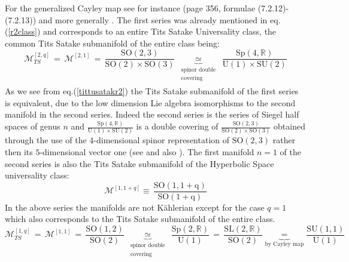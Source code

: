 \documentclass[10pt,a4paper]{article}
\begin{document}
For the generalized Cayley map see for instance \cite{advancio} (page 356, formulae (7.2.12)-(7.2.13)) and more generally \cite{mylecture}.
The first series was already mentioned in eq.(\ref{r2class}) and corresponds to an entire Tits Satake Universality class, the common Tits Satake submanifold of the entire class being:
\begin{equation}\label{tittusatakr2}
  \mathcal{M}^{[2,q]}_{TS} \, = \, \mathcal{M}^{[2,1]} \, = \, \frac{\mathrm{SO(2,3)}}{\mathrm{SO(2)}\times \mathrm{SO(3)}} \, \underbrace{\simeq}_{\begin{array}{c}
   \text{spinor double}\\
   \text{covering}\\
   \end{array}}\, \frac{\mathrm{Sp(4,\mathbb{R})}}{\mathrm{U(1)}\times \mathrm{SU(2)}}
\end{equation}
As we see from eq.(\ref{tittusatakr2}) the Tits Satake submanifold of the first series is equivalent, due to the low dimension Lie algebra isomorphisms to the second manifold in the second series. Indeed the second series is the series of Siegel half spaces of genus $n$ and $\frac{\mathrm{Sp(4,\mathbb{R})}}{\mathrm{U(1)}\times \mathrm{SU(2)}}$ is a double covering of $\frac{\mathrm{SO(2,3)}}{\mathrm{SO(2)}\times \mathrm{SO(3)}}$ obtained through the use of the $4$-dimensional spinor representation of $\mathrm{SO(2,3)}$ rather then its $5$-dimensional vector one (see
\cite{pgtstheory} and also \cite{fre2023book}).
The first manifold $n=1$ of the second series is also the Tits Satake submanifold of the Hyperbolic Space universality class:
\begin{equation}\label{cannoniconpanna}
  \mathcal{M}^{[1,1+q]} \equiv \,  \frac{\mathrm{SO(1,1+q)}}{\mathrm{SO(1+q)}}
\end{equation}
In the above series the manifolds are not K\"ahlerian except for the case $q=1$ which also corresponds to the Tits Satake submanifold of the entire class.
\begin{equation}\label{tittusatakr2}
  \mathcal{M}^{[1,q]}_{TS} \, = \, \mathcal{M}^{[1,1]} \, = \, \frac{\mathrm{SO(1,2)}}{ \mathrm{SO(2)}} \, \underbrace{\simeq}_{\begin{array}{c}
   \text{spinor double}\\
   \text{covering}\\
   \end{array}}\, \frac{\mathrm{Sp(2,\mathbb{R})}}{\mathrm{U(1)}}\, = \, \frac{\mathrm{SL(2,\mathbb{R})}}{\mathrm{SO(2)}}\underbrace{\, = \,}_{\text{by Cayley
  map}} \frac{\mathrm{SU(1,1)}}{\mathrm{U(1)}}
\end{equation}
\end{document}
